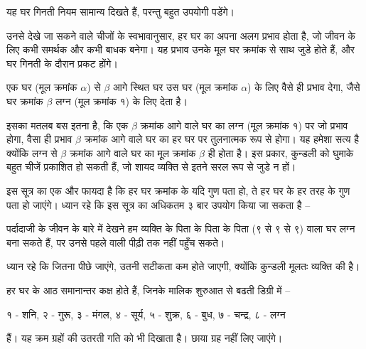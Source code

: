 यह घर गिनती नियम सामान्य दिखते हैं, परन्तु बहुत उपयोगी पडेंगे।

उनसे देखे जा सकने वाले चीजों के स्वभावानुसार, हर घर का अपना अलग प्रभाव होता है, जो जीवन के लिए कभी समर्थक और कभी बाधक बनेगा। यह प्रभाव उनके मूल घर क्रमांक से साथ जुडे होते हैं, और घर गिनती के दौरान प्रकट होंगे।
\begin{setdef}
    एक घर (मूल क्रमांक $\alpha$) से $\beta$ आगे स्थित घर उस घर (मूल क्रमांक $\alpha$) के लिए वैसे ही प्रभाव देगा, जैसे घर क्रमांक $\beta$ लग्न (मूल क्रमांक १) के लिए देता है।
\end{setdef}
इसका मतलब बस इतना है, कि एक $\beta$ क्रमांक आगे वाले घर का  लग्न (मूल क्रमांक १) पर जो प्रभाव  होगा, वैसा ही प्रभाव $\beta$  क्रमांक आगे वाले घर का  हर घर पर तुलनात्मक रूप से  होगा। यह हमेशा सत्य है क्योंकि लग्न से $\beta$ क्रमांक आगे वाले घर का मूल क्रमांक $\beta$ ही होता है। इस प्रकार, कुन्डली को घुमाके बहुत चीजें प्रकाशित हो सकती हैं, जो शायद व्यक्ति से इतने सरल रूप से जुडे न हों।

इस सूत्र का एक और फायदा है कि हर घर क्रमांक के यदि गुण पता हो, ते हर घर के हर तरह के गुण पता हो जाएंगे। ध्यान रहे कि इस सूत्र का  अधिकतम ३ बार उपयोग किया जा सकता है --
\begin{example}
    पर्दादाजी के जीवन के बारे में देखने हम व्यक्ति के पिता के पिता के पिता (९ से ९ से ९) वाला घर लग्न बना सकते हैं, पर उनसे पहले वाली पीढ़ी तक  नहीं पहुँच सकते।
\end{example}
ध्यान रहे कि जितना पीछे जाएंगे, उतनी सटीकता कम होते जाएगी, क्योंकि  कुन्डली मूलतः व्यक्ति की है।

हर घर के आठ समानान्तर कक्ष होते हैं, जिनके मालिक शुरुआत से बढती डिग्री में --
\begin{setdef}
    १ - शनि, २ - गुरू, ३ - मंगल, ४ - सूर्य, ५ - शुक्र, ६ - बुध, ७ - चन्द्र, ८ - लग्न
\end{setdef}
हैं। यह क्रम ग्रहों की उतरती गति को भी दिखाता है। छाया ग्रह नहीं लिए जाएंगे।
